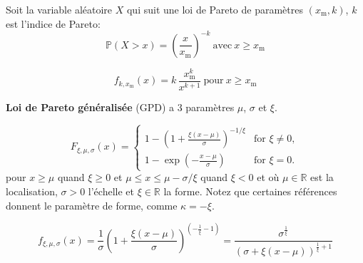 


\begin{f}
Soit la variable aléatoire \(X\) qui suit une loi de Pareto de paramètres \((x_{\mathrm{m}},k)\), \(k\) est l'indice de Pareto:
\[
\mathbb{P}(X>x)=\left(\frac{x}{x_{\mathrm{m}}}\right)^{-k}\ \mbox{avec}\ x \geq x_{\mathrm{m}} 
\]


\[
f_{k,x_\mathrm{m}}(x) = k\,\frac{x_\mathrm{m}^k}{x^{k+1}}\ \mbox{pour}\ x \ge x_\mathrm{m}
\]

\textbf{	Loi de Pareto généralisée} (GPD) a 3 paramètres \(\mu\), \(\sigma\) et \(\xi\).


\[
F_{\xi,\mu,\sigma}(x) = \begin{cases} 1 - \left(1+ \frac{\xi(x-\mu)}{\sigma}\right)^{-1/\xi} & \text{for }\xi \neq 0, \\ 1 - \exp \left(-\frac{x-\mu}{\sigma}\right) & \text{for }\xi = 0. \end{cases} 
\]
pour  \(x \geq \mu\)  quand \(\xi \geq 0\)  et \( \mu \leq x \leq \mu - \sigma /\xi\)  quand \( \xi < 0\) et où \(\mu\in\mathbb{R}\) est la localisation, \(\sigma>0\) l'échelle et  \(\xi\in\mathbb{R}\) la forme. 
Notez que certaines références donnent le \og{}paramètre de forme\fg{}, comme \(\kappa = - \xi\).

\[
f_{\xi,\mu,\sigma}(x) = \frac{1}{\sigma}\left(1 + \frac{\xi (x-\mu)}{\sigma}\right)^{\left(-\frac{1}{\xi} - 1\right)}
=
 \frac{\sigma^{\frac{1}{\xi}}}{\left(\sigma + \xi (x-\mu)\right)^{\frac{1}{\xi}+1}}
\]

\medskip

\begin{center}
		{\shorthandoff{:!;}	
}
\end{center}



\end{f}
